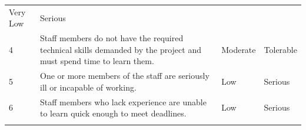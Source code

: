 \documentclass[]{article}
\begin{document}
\begin{longtable}[c]{@{}llll@{}}
\begin{minipage}[t]{0.22\columnwidth}
Very Low
\end{minipage} & \begin{minipage}[t]{0.22\columnwidth}\raggedright
Serious
\end{minipage}
\\\addlinespace
\begin{minipage}[t]{0.22\columnwidth}\raggedright
4
\end{minipage} & \begin{minipage}[t]{0.22\columnwidth}\raggedright
Staff members do not have the required technical skills demanded by the
project and must spend time to learn them.
\end{minipage} & \begin{minipage}[t]{0.22\columnwidth}\raggedright
Moderate
\end{minipage} & \begin{minipage}[t]{0.22\columnwidth}\raggedright
Tolerable
\end{minipage}
\\\addlinespace
\begin{minipage}[t]{0.22\columnwidth}\raggedright
5
\end{minipage} & \begin{minipage}[t]{0.22\columnwidth}\raggedright
One or more members of the staff are seriously ill or incapable of
working.
\end{minipage} & \begin{minipage}[t]{0.22\columnwidth}\raggedright
Low
\end{minipage} & \begin{minipage}[t]{0.22\columnwidth}\raggedright
Serious
\end{minipage}
\\\addlinespace
\begin{minipage}[t]{0.22\columnwidth}\raggedright
6
\end{minipage} & \begin{minipage}[t]{0.22\columnwidth}\raggedright
Staff members who lack experience are unable to learn quick enough to
meet deadlines.
\end{minipage} & \begin{minipage}[t]{0.22\columnwidth}\raggedright
Low
\end{minipage} & \begin{minipage}[t]{0.22\columnwidth}\raggedright
Serious
\end{minipage}
\\\addlinespace
\begin{minipage}[t]{0.22\columnwidth}\raggedright

\end{minipage}
\end{longtable}
\end{document}
